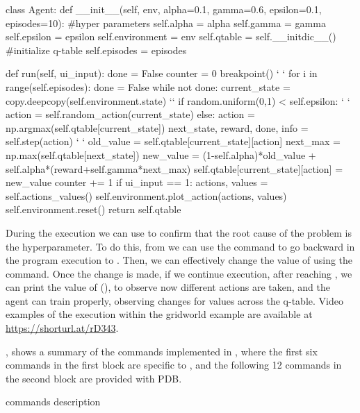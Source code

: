 \begin{python}[numbers=left,
	caption={\flik running example of the gridworld environment},
	label={lst:gridworld-learner}]
class Agent:
  def __init__(self, env, alpha=0.1, gamma=0.6, epsilon=0.1, episodes=10):
    #hyper parameters
    self.alpha = alpha
    self.gamma = gamma
    self.epsilon = epsilon
    self.environment = env
    self.qtable = self.__initdic__() #initialize q-table
    self.episodes = episodes
    
  def run(self, ui_input):
      done = False
      counter = 0
      breakpoint()  ` \label{ln:breakpoint} `
      for i in range(self.episodes):
        done = False
        while not done:
          current_state = copy.deepcopy(self.environment.state) `\label{ln:back1}`
          if random.uniform(0,1) < self.epsilon:   ` \label{ln:stop1} `
            action = self.random_action(current_state)
          else:
            action = np.argmax(self.qtable[current_state])  
          next_state, reward, done, info = self.step(action) ` \label{ln:stop2} `
          old_value = self.qtable[current_state][action]
          next_max = np.max(self.qtable[next_state])
          new_value = (1-self.alpha)*old_value + self.alpha*(reward+self.gamma*next_max)
          self.qtable[current_state][action] = new_value
          counter += 1
        if ui_input == 1:
          actions, values = self.actions_values()
          self.environment.plot_action(actions, values)
        self.environment.reset()
    return self.qtable
\end{python}

During the execution we can use \flik to confirm that the root cause of the problem is the  
hyperparameter. To do this, from  we can use the command  to go 
backward in the program execution to . Then, we can effectively change the value of 
 using the  command. Once the change is made, if we 
continue execution, after reaching , we can print the value of  (), 
to observe now different actions are taken, and the agent can train properly, observing changes for 
values across the q-table. Video examples of the \flik execution within the gridworld example are available at \url{https://shorturl.at/rD343}.

, shows a summary of the commands implemented in \flik, where the 
first six commands in the first block are specific to \flik, and the following 12 commands in the second 
block are provided with \ac{PDB}.

\begin{table}
  \centering
  
  \caption{\flik commands description}
  \label{tab:flik-commands}
\end{table}


\endinput

